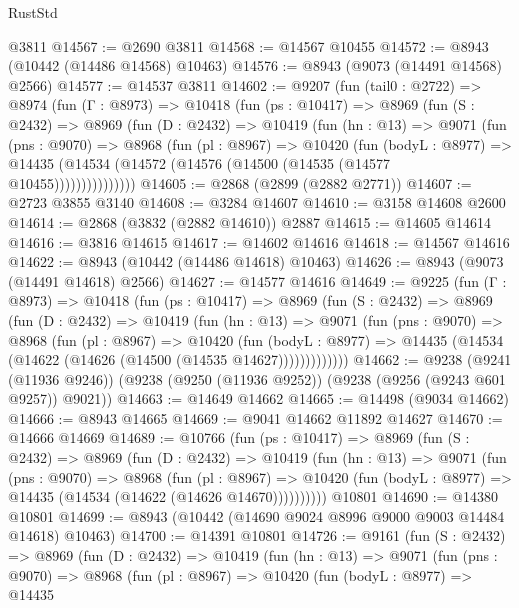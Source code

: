 \begin{lexlean}{RustStd}
\begin{coremodule}
{\begin{coremodule}
{{{{{{{{{{{{{{{{{{{{{{{{{{{{{{{{{{{{{{{    @3811
@14567 := @2690 @3811
@14568 := @14567 @10455
@14572 := @8943 (@10442 (@14486 @14568) @10463)
@14576 := @8943 (@9073 (@14491 @14568) @2566)
@14577 := @14537 @3811
@14602 := @9207
    (fun (tail0 : @2722) =>
    @8974
      (fun (Γ : @8973) =>
      @10418
        (fun (ps : @10417) =>
        @8969
          (fun (S : @2432) =>
          @8969
            (fun (D : @2432) =>
            @10419
              (fun (hn : @13) =>
              @9071
                (fun (pns : @9070) =>
                @8968
                  (fun (pl : @8967) =>
                  @10420
                    (fun (bodyL : @8977) =>
                    @14435 (@14534 (@14572 (@14576 (@14500 (@14535 (@14577 @10455)))))))))))))))
@14605 := @2868 (@2899 (@2882 @2771))
@14607 := @2723 @3855 @3140
@14608 := @3284 @14607
@14610 := @3158 @14608 @2600
@14614 := @2868 (@3832 (@2882 @14610)) @2887
@14615 := @14605 @14614
@14616 := @3816 @14615
@14617 := @14602 @14616
@14618 := @14567 @14616
@14622 := @8943 (@10442 (@14486 @14618) @10463)
@14626 := @8943 (@9073 (@14491 @14618) @2566)
@14627 := @14577 @14616
@14649 := @9225
    (fun (Γ : @8973) =>
    @10418
      (fun (ps : @10417) =>
      @8969
        (fun (S : @2432) =>
        @8969
          (fun (D : @2432) =>
          @10419
            (fun (hn : @13) =>
            @9071
              (fun (pns : @9070) =>
              @8968
                (fun (pl : @8967) =>
                @10420
                  (fun (bodyL : @8977) =>
                  @14435 (@14534 (@14622 (@14626 (@14500 (@14535 @14627)))))))))))))
@14662 := @9238
    (@9241 (@11936 @9246))
    (@9238 (@9250 (@11936 @9252)) (@9238 (@9256 (@9243 @601 @9257)) @9021))
@14663 := @14649 @14662
@14665 := @14498 (@9034 @14662)
@14666 := @8943 @14665
@14669 := @9041 @14662 @11892 @14627
@14670 := @14666 @14669
@14689 := @10766
    (fun (ps : @10417) =>
    @8969
      (fun (S : @2432) =>
      @8969
        (fun (D : @2432) =>
        @10419
          (fun (hn : @13) =>
          @9071
            (fun (pns : @9070) =>
            @8968
              (fun (pl : @8967) =>
              @10420 (fun (bodyL : @8977) => @14435 (@14534 (@14622 (@14626 @14670))))))))))
    @10801
@14690 := @14380 @10801
@14699 := @8943 (@10442 (@14690 @9024 @8996 @9000 @9003 @14484 @14618) @10463)
@14700 := @14391 @10801
@14726 := @9161
    (fun (S : @2432) =>
    @8969
      (fun (D : @2432) =>
      @10419
        (fun (hn : @13) =>
        @9071
          (fun (pns : @9070) =>
          @8968
            (fun (pl : @8967) =>
            @10420
              (fun (bodyL : @8977) =>
              @14435
}}}}}}}}}}}}}}}}}}}}}}}}}}}}}}}}}}}}}}}
\end{coremodule}}
\end{coremodule}
\end{lexlean}
